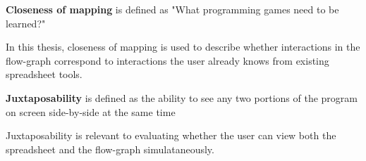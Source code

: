 \begin{definition}
    \label{def:closeness-of-mapping}
    \textbf{Closeness of mapping} is defined as "What programming games need to be learned?" \cite[p.~138]{green_usability_1996}
\end{definition}
In this thesis, closeness of mapping is used to describe whether interactions in the flow-graph correspond to interactions the user already knows from existing spreadsheet tools.

\begin{definition}
    \label{def:juxtaposability}
    \textbf{Juxtaposability} is defined as the ability to see any two portions of the program on screen side-by-side at the same time \cite[p.~162]{green_usability_1996}
\end{definition}
Juxtaposability is relevant to evaluating whether the user can view both the spreadsheet and the flow-graph simulataneously.